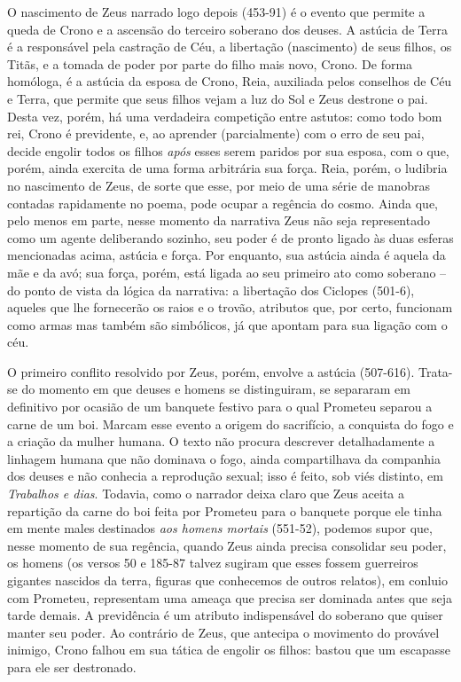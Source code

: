 O nascimento de Zeus narrado logo depois (453-91) é o evento que permite
a queda de Crono e a ascensão do terceiro soberano dos deuses. A astúcia
de Terra é a responsável pela castração de Céu, a libertação
(nascimento) de seus filhos, os Titãs, e a tomada de
poder por parte do filho mais novo, Crono. De forma homóloga, é a
astúcia da esposa de Crono, Reia, auxiliada pelos conselhos de Céu e
Terra, que permite que seus filhos vejam a luz do Sol e Zeus destrone o
pai. Desta vez, porém, há uma verdadeira competição entre astutos: como
todo bom rei, Crono é previdente, e, ao aprender (parcialmente) com o
erro de seu pai, decide engolir todos os filhos \emph{após} esses serem
paridos por sua esposa, com o que, porém, ainda exercita de uma forma
arbitrária sua força. Reia, porém, o ludibria no nascimento de Zeus, de
sorte que esse, por meio de uma série de manobras contadas rapidamente
no poema, pode ocupar a regência do cosmo. Ainda que, pelo menos em
parte, nesse momento da narrativa Zeus não seja representado como um
agente deliberando sozinho, seu poder é de pronto ligado às duas esferas
mencionadas acima, astúcia e força. Por enquanto, sua astúcia ainda é
aquela da mãe e da avó; sua força, porém, está ligada ao seu primeiro
ato como soberano -- do ponto de vista da lógica da narrativa: a
libertação dos Ciclopes (501-6), aqueles que lhe fornecerão os raios e o
trovão, atributos que, por certo, funcionam como armas mas também são
simbólicos, já que apontam para sua ligação com o céu.

O primeiro conflito resolvido por Zeus, porém, envolve a astúcia
(507-616). Trata-se do momento em que deuses e homens se distinguiram,
se separaram em definitivo por ocasião de um banquete festivo para o
qual Prometeu separou a carne de um boi. Marcam esse evento a origem do
sacrifício, a conquista do fogo e a criação da mulher humana. O texto
não procura descrever detalhadamente a linhagem humana que não dominava
o fogo, ainda compartilhava da companhia dos deuses e não conhecia a
reprodução sexual; isso é feito, sob viés distinto, em \emph{Trabalhos e
dias}. Todavia, como o narrador deixa claro que Zeus aceita a repartição
da carne do boi feita por Prometeu para o banquete porque ele tinha em
mente males destinados \emph{aos homens mortais} (551-52), podemos supor
que, nesse momento de sua regência, quando Zeus ainda precisa consolidar
seu poder, os homens (os versos 50 e 185-87 talvez sugiram que esses
fossem guerreiros gigantes nascidos da terra, figuras que conhecemos de
outros relatos), em conluio com Prometeu, representam uma ameaça que
precisa ser dominada antes que seja tarde demais. A previdência é um
atributo indispensável do soberano que quiser manter seu poder. Ao
contrário de Zeus, que antecipa o movimento do provável inimigo, Crono
falhou em sua tática de engolir os filhos: bastou que um escapasse para
ele ser destronado.

